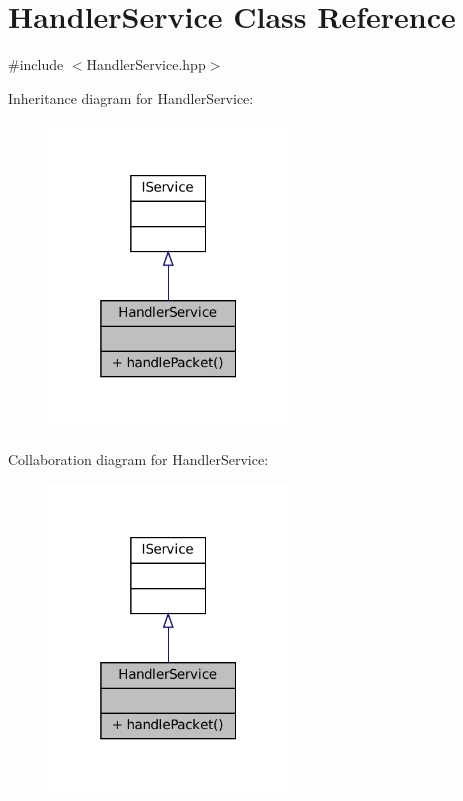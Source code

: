 \hypertarget{classHandlerService}{}\section{Handler\+Service Class Reference}
\label{classHandlerService}


{\ttfamily \#include $<$Handler\+Service.\+hpp$>$}



Inheritance diagram for Handler\+Service\+:
\nopagebreak
\begin{figure}[H]
\begin{center}
\leavevmode
\includegraphics[width=181pt]{classHandlerService__inherit__graph}
\end{center}
\end{figure}


Collaboration diagram for Handler\+Service\+:
\nopagebreak
\begin{figure}[H]
\begin{center}
\leavevmode
\includegraphics[width=181pt]{classHandlerService__coll__graph}
\end{center}
\end{figure}
